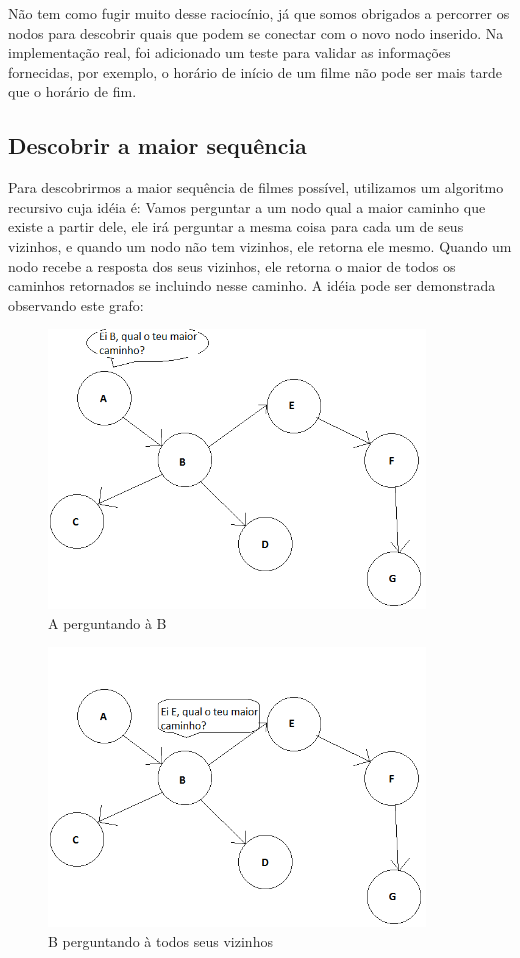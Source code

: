 \documentclass[12pt]{article}
\begin{document}
Não tem como fugir muito desse raciocínio, já que somos obrigados a percorrer os
nodos para descobrir quais que podem se conectar com o novo nodo inserido. Na
implementação real, foi adicionado um teste para validar as informações
fornecidas, por exemplo, o horário de início de um filme não pode ser mais tarde
que o horário de fim.

\subsection{Descobrir a maior sequência}

Para descobrirmos a maior sequência de filmes possível, utilizamos um algoritmo
recursivo cuja idéia é: Vamos perguntar a um nodo qual a maior caminho que
existe a partir dele, ele irá perguntar a mesma coisa para cada um de seus
vizinhos, e quando um nodo não tem vizinhos, ele retorna ele mesmo. Quando um
nodo recebe a resposta dos seus vizinhos, ele retorna o maior de todos os
caminhos retornados se incluindo nesse caminho. A idéia pode ser demonstrada
observando este grafo:

\begin{figure}[H]
\centering
\includegraphics[width=100mm]{graphA.png}
\caption{A perguntando à B}
\label{graphA}
\end{figure}

\begin{figure}[H]
\centering
\includegraphics[width=100mm]{graphB.png}
\caption{B perguntando à todos seus vizinhos}
\label{graphB}
\end{figure}
\end{document}
